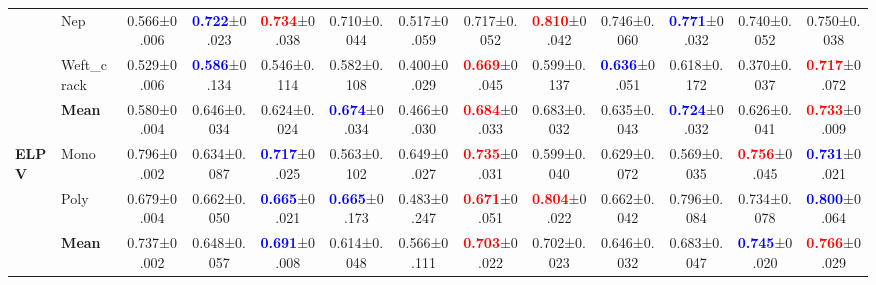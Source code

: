 \documentclass[10pt,twocolumn,letterpaper]{article}
\begin{document}
\begin{table*}[bt]
{\begin{tabular}{l@{}l@{}|c||ccccc||ccccc}
          & Nep & 0.566\footnotesize{±0.006}& \textcolor{blue}{\textbf{0.722}}\footnotesize{±0.023}& \textcolor{red}{\textbf{0.734}}\footnotesize{±0.038}& 0.710\footnotesize{±0.044}& 0.517\footnotesize{±0.059}& 0.717\footnotesize{±0.052}& \textcolor{red}{\textbf{0.810}}\footnotesize{±0.042}& 0.746\footnotesize{±0.060}& \textcolor{blue}{\textbf{0.771}}\footnotesize{±0.032}& 0.740\footnotesize{±0.052}& 0.750\footnotesize{±0.038} \\
          & Weft\_crack & 0.529\footnotesize{±0.006}& \textcolor{blue}{\textbf{0.586}}\footnotesize{±0.134}& 0.546\footnotesize{±0.114}& 0.582\footnotesize{±0.108}& 0.400\footnotesize{±0.029}& \textcolor{red}{\textbf{0.669}}\footnotesize{±0.045}& 0.599\footnotesize{±0.137}& \textcolor{blue}{\textbf{0.636}}\footnotesize{±0.051}& 0.618\footnotesize{±0.172}& 0.370\footnotesize{±0.037}& \textcolor{red}{\textbf{0.717}}\footnotesize{±0.072} \\\cline{2-13}
          & \textbf{Mean}  & 0.580\footnotesize{±0.004}& 0.646\footnotesize{±0.034}& 0.624\footnotesize{±0.024}& \textcolor{blue}{\textbf{0.674}}\footnotesize{±0.034}& 0.466\footnotesize{±0.030}& \textcolor{red}{\textbf{0.684}}\footnotesize{±0.033}& 0.683\footnotesize{±0.032}& 0.635\footnotesize{±0.043}& \textcolor{blue}{\textbf{0.724}}\footnotesize{±0.032}& 0.626\footnotesize{±0.041}& \textcolor{red}{\textbf{0.733}}\footnotesize{±0.009}  \\
    \hline
    \multirow{3}[0]{*}{\textbf{ELPV}} & Mono & 0.796\footnotesize{±0.002}& 0.634\footnotesize{±0.087}& \textcolor{blue}{\textbf{0.717}}\footnotesize{±0.025}& 0.563\footnotesize{±0.102}& 0.649\footnotesize{±0.027}& \textcolor{red}{\textbf{0.735}}\footnotesize{±0.031}& 0.599\footnotesize{±0.040}& 0.629\footnotesize{±0.072}& 0.569\footnotesize{±0.035}& \textcolor{red}{\textbf{0.756}}\footnotesize{±0.045}& \textcolor{blue}{\textbf{0.731}}\footnotesize{±0.021} \\
          & Poly & 0.679\footnotesize{±0.004}& 0.662\footnotesize{±0.050}& \textcolor{blue}{\textbf{0.665}}\footnotesize{±0.021}& \textcolor{blue}{\textbf{0.665}}\footnotesize{±0.173}& 0.483\footnotesize{±0.247}& \textcolor{red}{\textbf{0.671}}\footnotesize{±0.051}& \textcolor{red}{\textbf{0.804}}\footnotesize{±0.022}& 0.662\footnotesize{±0.042}& 0.796\footnotesize{±0.084}& 0.734\footnotesize{±0.078}& \textcolor{blue}{\textbf{0.800}}\footnotesize{±0.064} \\
          \cline{2-13}
          & \textbf{Mean}  & 0.737\footnotesize{±0.002}& 0.648\footnotesize{±0.057}& \textcolor{blue}{\textbf{0.691}}\footnotesize{±0.008}& 0.614\footnotesize{±0.048}& 0.566\footnotesize{±0.111}& \textcolor{red}{\textbf{0.703}}\footnotesize{±0.022}& 0.702\footnotesize{±0.023}& 0.646\footnotesize{±0.032}& 0.683\footnotesize{±0.047}&\textcolor{blue}{\textbf{ 0.745}}\footnotesize{±0.020}& \textcolor{red}{\textbf{0.766}}\footnotesize{±0.029} \\

\end{tabular}}
\end{table*}
\end{document}
